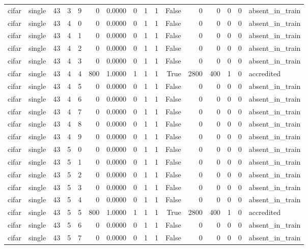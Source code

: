 \begin{tabular}{llrrrrrrrrrrrrrl}
cifar & single & 43 & 3 & 9 & 0 & 0.0000 & 0 & 1 & 1 & False & 0 & 0 & 0 & 0 & absent\_in\_train \\
cifar & single & 43 & 4 & 0 & 0 & 0.0000 & 0 & 1 & 1 & False & 0 & 0 & 0 & 0 & absent\_in\_train \\
cifar & single & 43 & 4 & 1 & 0 & 0.0000 & 0 & 1 & 1 & False & 0 & 0 & 0 & 0 & absent\_in\_train \\
cifar & single & 43 & 4 & 2 & 0 & 0.0000 & 0 & 1 & 1 & False & 0 & 0 & 0 & 0 & absent\_in\_train \\
cifar & single & 43 & 4 & 3 & 0 & 0.0000 & 0 & 1 & 1 & False & 0 & 0 & 0 & 0 & absent\_in\_train \\
cifar & single & 43 & 4 & 4 & 800 & 1.0000 & 1 & 1 & 1 & True & 2800 & 400 & 1 & 0 & accredited \\
cifar & single & 43 & 4 & 5 & 0 & 0.0000 & 0 & 1 & 1 & False & 0 & 0 & 0 & 0 & absent\_in\_train \\
cifar & single & 43 & 4 & 6 & 0 & 0.0000 & 0 & 1 & 1 & False & 0 & 0 & 0 & 0 & absent\_in\_train \\
cifar & single & 43 & 4 & 7 & 0 & 0.0000 & 0 & 1 & 1 & False & 0 & 0 & 0 & 0 & absent\_in\_train \\
cifar & single & 43 & 4 & 8 & 0 & 0.0000 & 0 & 1 & 1 & False & 0 & 0 & 0 & 0 & absent\_in\_train \\
cifar & single & 43 & 4 & 9 & 0 & 0.0000 & 0 & 1 & 1 & False & 0 & 0 & 0 & 0 & absent\_in\_train \\
cifar & single & 43 & 5 & 0 & 0 & 0.0000 & 0 & 1 & 1 & False & 0 & 0 & 0 & 0 & absent\_in\_train \\
cifar & single & 43 & 5 & 1 & 0 & 0.0000 & 0 & 1 & 1 & False & 0 & 0 & 0 & 0 & absent\_in\_train \\
cifar & single & 43 & 5 & 2 & 0 & 0.0000 & 0 & 1 & 1 & False & 0 & 0 & 0 & 0 & absent\_in\_train \\
cifar & single & 43 & 5 & 3 & 0 & 0.0000 & 0 & 1 & 1 & False & 0 & 0 & 0 & 0 & absent\_in\_train \\
cifar & single & 43 & 5 & 4 & 0 & 0.0000 & 0 & 1 & 1 & False & 0 & 0 & 0 & 0 & absent\_in\_train \\
cifar & single & 43 & 5 & 5 & 800 & 1.0000 & 1 & 1 & 1 & True & 2800 & 400 & 1 & 0 & accredited \\
cifar & single & 43 & 5 & 6 & 0 & 0.0000 & 0 & 1 & 1 & False & 0 & 0 & 0 & 0 & absent\_in\_train \\
cifar & single & 43 & 5 & 7 & 0 & 0.0000 & 0 & 1 & 1 & False & 0 & 0 & 0 & 0 & absent\_in\_train \\

\end{tabular}
